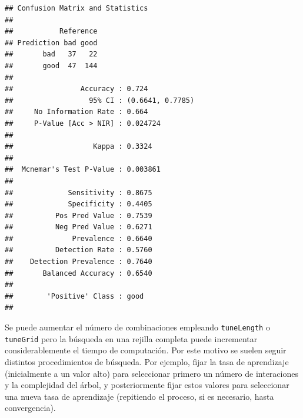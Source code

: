 \documentclass[
  spanish,
]{book}
\newenvironment{Shaded}{\begin{snugshade}}{\end{snugshade}}
\newcommand{\DataTypeTok}[1]{\textcolor[rgb]{0.13,0.29,0.53}{#1}}
\newcommand{\KeywordTok}[1]{\textcolor[rgb]{0.13,0.29,0.53}{\textbf{#1}}}
\newcommand{\NormalTok}[1]{#1}
\newcommand{\OperatorTok}[1]{\textcolor[rgb]{0.81,0.36,0.00}{\textbf{#1}}}
\newcommand{\StringTok}[1]{\textcolor[rgb]{0.31,0.60,0.02}{#1}}
\theoremstyle{break}
\theoremstyle{definition}
\theoremstyle{definition}
\theoremstyle{definition}
\theoremstyle{remark}
\begin{document}
\begin{Shaded}
\end{Shaded}

\begin{verbatim}
## Confusion Matrix and Statistics
## 
##           Reference
## Prediction bad good
##       bad   37   22
##       good  47  144
##                                           
##                Accuracy : 0.724           
##                  95% CI : (0.6641, 0.7785)
##     No Information Rate : 0.664           
##     P-Value [Acc > NIR] : 0.024724        
##                                           
##                   Kappa : 0.3324          
##                                           
##  Mcnemar's Test P-Value : 0.003861        
##                                           
##             Sensitivity : 0.8675          
##             Specificity : 0.4405          
##          Pos Pred Value : 0.7539          
##          Neg Pred Value : 0.6271          
##              Prevalence : 0.6640          
##          Detection Rate : 0.5760          
##    Detection Prevalence : 0.7640          
##       Balanced Accuracy : 0.6540          
##                                           
##        'Positive' Class : good            
## 
\end{verbatim}

Se puede aumentar el número de combinaciones empleando \texttt{tuneLength} o \texttt{tuneGrid} pero la búsqueda en una rejilla completa puede incrementar considerablemente el tiempo de computación.
Por este motivo se suelen seguir distintos procedimientos de búsqueda. Por ejemplo, fijar la tasa de aprendizaje (inicialmente a un valor alto) para seleccionar primero un número de interaciones y la complejidad del árbol, y posteriormente fijar estos valores para seleccionar una nueva tasa de aprendizaje (repitiendo el proceso, si es necesario, hasta convergencia).
\end{document}
